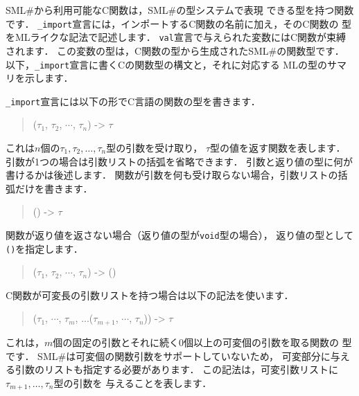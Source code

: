\documentclass{jbook}
\newif\ifjp
\newcommand{\smlsharp}{SML\#}
\newenvironment{program}{\begin{quote}\begin{tt}}%
                        {\end{tt}\end{quote}}
\begin{document}
\ifjp%
	\smlsharp{}から利用可能なC関数は，\smlsharp{}の型システムで表現
できる型を持つ関数です．
	{\tt \_import}宣言には，インポートするC関数の名前に加え，そのC関数の
型をMLライクな記法で記述します．
	{\tt val}宣言で与えられた変数にはC関数が束縛されます．
	この変数の型は，C関数の型から生成された\smlsharp{}の関数型です．
	以下，{\tt \_import}宣言に書くCの関数型の構文と，それに対応する
MLの型のサマリを示します．

	{\tt \_import}宣言には以下の形でC言語の関数の型を書きます．
\begin{program}
($\tau_1$, $\tau_2$, $\cdots$, $\tau_n$) -> $\tau$
\end{program}
	これは$n$個の$\tau_1, \tau_2, \ldots, \tau_n$型の引数を受け取り，
$\tau$型の値を返す関数を表します．
	引数が1つの場合は引数リストの括弧を省略できます．
	引数と返り値の型に何が書けるかは後述します．
	関数が引数を何も受け取らない場合，引数リストの括弧だけを書きます．
\begin{program}
() -> $\tau$
\end{program}
	関数が返り値を返さない場合（返り値の型が{\tt void}型の場合），
返り値の型として{\tt ()}を指定します．
\begin{program}
($\tau_1$, $\tau_2$, $\cdots$, $\tau_n$) -> ()
\end{program}
	C関数が可変長の引数リストを持つ場合は以下の記法を使います．
\begin{program}
($\tau_1$, $\cdots$, $\tau_m$, ...($\tau_{m+1}$, $\cdots$, $\tau_{n}$)) -> $\tau$
\end{program}
	これは，$m$個の固定の引数とそれに続く0個以上の可変個の引数を取る関数の
型です．
	\smlsharp{}は可変個の関数引数をサポートしていないため，
可変部分に与える引数のリストも指定する必要があります．
	この記法は，可変引数リストに$\tau_{m+1}, \ldots, \tau_{n}$型の引数を
与えることを表します．
\end{document}
